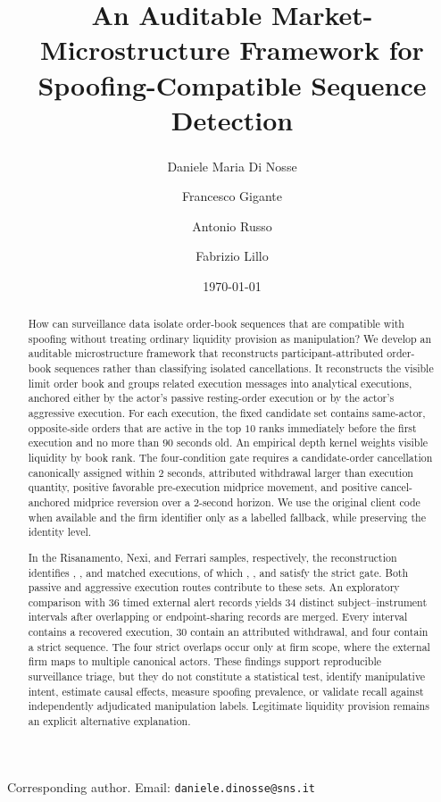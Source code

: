 \documentclass[11pt]{article}
\title{An Auditable Market-Microstructure Framework for Spoofing-Compatible Sequence Detection}
\author[1]{Daniele Maria Di Nosse\textsuperscript{\dag}}
\author[2]{Francesco Gigante}
\author[2]{Antonio Russo}
\author[1]{Fabrizio Lillo}
\affil[1]{Scuola Normale Superiore, Pisa, Italy}
\affil[2]{Consob, Rome, Italy}
\date{\today}
\begin{document}
\maketitle
\begin{center}
  \footnotesize
  \dag Corresponding author. Email: \texttt{daniele.dinosse@sns.it}
\end{center}

\begin{abstract}
How can surveillance data isolate order-book sequences that are compatible with spoofing without treating ordinary
liquidity provision as manipulation? We develop an auditable microstructure framework that reconstructs participant-attributed
order-book sequences rather than classifying isolated cancellations. It reconstructs the visible limit order book and groups
related execution messages into analytical executions, anchored either by the actor's passive resting-order execution or by the actor's
aggressive execution. For each execution, the fixed candidate set contains same-actor, opposite-side orders that are active
in the top $10$ ranks immediately before the first execution and no more than $90$ seconds old. An empirical depth kernel
weights visible liquidity by book rank. The four-condition gate requires a candidate-order cancellation canonically assigned
within $2$ seconds, attributed withdrawal larger than execution quantity, positive favorable pre-execution midprice movement,
and positive cancel-anchored midprice reversion over a $2$-second horizon. We use the original client code when available and
the firm identifier only as a labelled fallback, while preserving the identity level.

In the Risanamento, Nexi, and Ferrari samples, respectively, the reconstruction identifies
\RisanamentoMatchedClusters{}, \NexiMatchedClusters{}, and \FerrariMatchedClusters{} matched executions, of which
\RisanamentoCompatibleSequences{}, \NexiCompatibleSequences{}, and \FerrariCompatibleSequences{} satisfy the strict gate.
Both passive and aggressive execution routes contribute to these sets. An exploratory comparison with $36$ timed external
alert records yields $34$ distinct subject--instrument intervals after overlapping or endpoint-sharing records are merged.
Every interval contains a recovered execution, $30$ contain an attributed withdrawal, and four contain a strict sequence.
The four strict overlaps occur only at firm scope, where the external firm maps to multiple canonical actors. These findings
support reproducible surveillance triage, but they do not constitute a statistical test, identify manipulative intent, estimate
causal effects, measure spoofing prevalence, or validate recall against independently adjudicated manipulation labels.
Legitimate liquidity provision remains an explicit alternative explanation.
\end{abstract}
\end{document}
